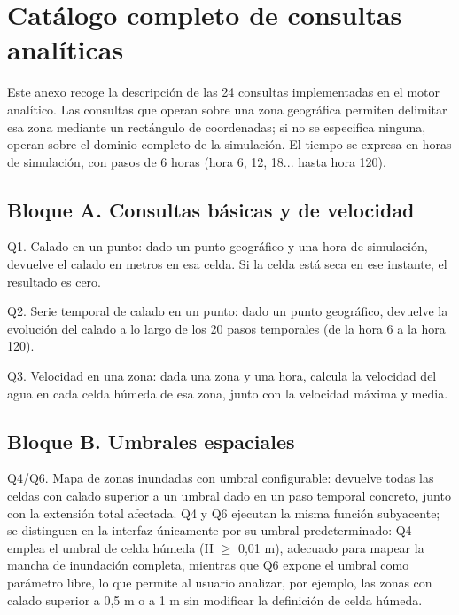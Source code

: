 \chapter{Catálogo completo de consultas analíticas}\label{anexo-a.-catalogo-completo-de-consultas-analiticas}

Este anexo recoge la descripción de las 24 consultas implementadas en el motor analítico. Las consultas que operan sobre una zona geográfica permiten delimitar esa zona mediante un rectángulo de coordenadas; si no se especifica ninguna, operan sobre el dominio completo de la simulación. El tiempo se expresa en horas de simulación, con pasos de 6 horas (hora 6, 12, 18... hasta hora 120).

\section{Bloque A. Consultas básicas y de velocidad}\label{bloque-a.-consultas-basicas-y-de-velocidad}

Q1. Calado en un punto: dado un punto geográfico y una hora de simulación, devuelve el calado en metros en esa celda. Si la celda está seca en ese instante, el resultado es cero.

Q2. Serie temporal de calado en un punto: dado un punto geográfico, devuelve la evolución del calado a lo largo de los 20 pasos temporales (de la hora 6 a la hora 120).

Q3. Velocidad en una zona: dada una zona y una hora, calcula la velocidad del agua en cada celda húmeda de esa zona, junto con la velocidad máxima y media.

\section{Bloque B. Umbrales espaciales}\label{bloque-b.-umbrales-espaciales}

Q4/Q6. Mapa de zonas inundadas con umbral configurable: devuelve todas las celdas con calado superior a un umbral dado en un paso temporal concreto, junto con la extensión total afectada. Q4 y Q6 ejecutan la misma función subyacente; se distinguen en la interfaz únicamente por su umbral predeterminado: Q4 emplea el umbral de celda húmeda (H $\geq$ 0,01 m), adecuado para mapear la mancha de inundación completa, mientras que Q6 expone el umbral como parámetro libre, lo que permite al usuario analizar, por ejemplo, las zonas con calado superior a 0,5 m o a 1 m sin modificar la definición de celda húmeda.


